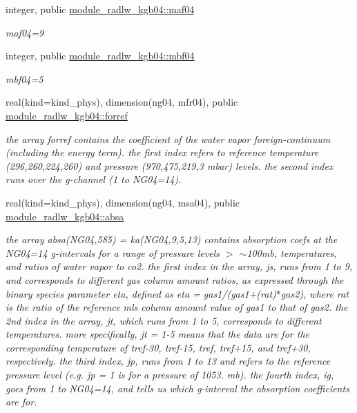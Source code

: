 \begin{DoxyCompactItemize}
integer, public \hyperlink{group__module__radlw__kgbnn_ga60ff35def4e526c7d9cf3ec88bdd4485}{module\+\_\+radlw\+\_\+kgb04\+::maf04}
\begin{DoxyCompactList}\small\item\em maf04=9 \end{DoxyCompactList}\item 
integer, public \hyperlink{group__module__radlw__kgbnn_ga768f4447809fb11206dce383a121d595}{module\+\_\+radlw\+\_\+kgb04\+::mbf04}
\begin{DoxyCompactList}\small\item\em mbf04=5 \end{DoxyCompactList}\item 
real(kind=kind\+\_\+phys), dimension(ng04, mfr04), public \hyperlink{group__module__radlw__kgbnn_ga816fd065291a92c13d026d38a708479b}{module\+\_\+radlw\+\_\+kgb04\+::forref}
\begin{DoxyCompactList}\small\item\em the array forref contains the coefficient of the water vapor foreign-\/continuum (including the energy term). the first index refers to reference temperature (296,260,224,260) and pressure (970,475,219,3 mbar) levels. the second index runs over the g-\/channel (1 to N\+G04=14). \end{DoxyCompactList}\item 
real(kind=kind\+\_\+phys), dimension(ng04, msa04), public \hyperlink{group__module__radlw__kgbnn_ga8d73bb6971c872e15a24a81d3917167e}{module\+\_\+radlw\+\_\+kgb04\+::absa}
\begin{DoxyCompactList}\small\item\em the array absa(\+N\+G04,585) = ka(\+N\+G04,9,5,13) contains absorption coefs at the N\+G04=14 g-\/intervals for a range of pressure levels $>$ $\sim$100mb, temperatures, and ratios of water vapor to co2. the first index in the array, js, runs from 1 to 9, and corresponds to different gas column amount ratios, as expressed through the binary species parameter eta, defined as eta = gas1/(gas1+(rat)$\ast$gas2), where rat is the ratio of the reference mls column amount value of gas1 to that of gas2. the 2nd index in the array, jt, which runs from 1 to 5, corresponds to different temperatures. more specifically, jt = 1-\/5 means that the data are for the corresponding temperature of tref-\/30, tref-\/15, tref, tref+15, and tref+30, respectively. the third index, jp, runs from 1 to 13 and refers to the reference pressure level (e.\+g. jp = 1 is for a pressure of 1053. mb). the fourth index, ig, goes from 1 to N\+G04=14, and tells us which g-\/interval the absorption coefficients are for. \end{DoxyCompactList}\item 

\end{DoxyCompactItemize}
